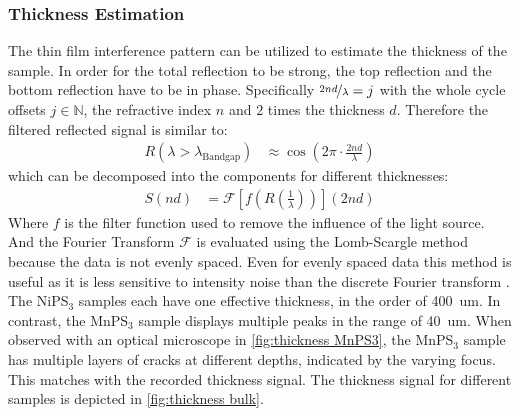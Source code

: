 \documentclass[
	twoside,
	parskip=half,
	a4paper,
]{scrbook}
\begin{document}
\subsubsection{Thickness Estimation}
\label{sec:thickness}
The thin film interference pattern can be utilized to estimate the thickness of the sample.
In order for the total reflection to be strong, the top reflection and the bottom reflection have to be in phase.
Specifically $\nicefrac{2nd}{\lambda}=j$ with the whole cycle offsets $j\in\mathbb{N}$, the refractive index $n$ and $2$ times the thickness $d$.
Therefore the filtered reflected signal is similar to:
\begin{align}
	R(\lambda > \lambda_\text{Bandgap}) &\approx \cos \left( 2 \pi \cdot \frac{2 n d}{\lambda} \right)
\end{align}
which can be decomposed into the components for different thicknesses:
\begin{align}
	S(nd) &= \mathcal{F}\left[ f\left(R\left(\frac{1}{\lambda}\right)\right)\right]( 2 nd)
\end{align}
Where $f$ is the filter function used to remove the influence of the light source.
And the Fourier Transform $\mathcal{F}$ is evaluated using the Lomb-Scargle method \cite{scargle} because the data is not evenly spaced. 
Even for evenly spaced data this method is useful as it is less sensitive to intensity noise than the discrete Fourier transform \cite{scargle}.\\
The NiPS$_3$ samples each have one effective thickness, in the order of \SI{400}{um}.
In contrast, the MnPS$_3$ sample displays multiple peaks in the range of \SI{40}{um}.
When observed with an optical microscope in \autoref{fig:thickness MnPS3}, the MnPS$_3$ sample has multiple layers of cracks at different depths, indicated by the varying focus.
This matches with the recorded thickness signal.
The thickness signal for different samples is depicted in \autoref{fig:thickness bulk}.
\end{document}
